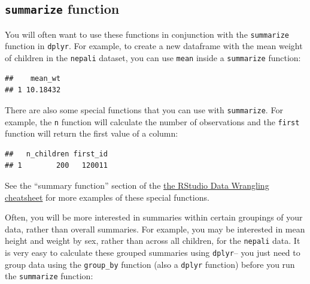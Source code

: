 \documentclass[]{book}
\makeatletter
\newenvironment{Shaded}{\begin{snugshade}}{\end{snugshade}}
\newcommand{\KeywordTok}[1]{\textcolor[rgb]{0.13,0.29,0.53}{\textbf{#1}}}
\newcommand{\DataTypeTok}[1]{\textcolor[rgb]{0.13,0.29,0.53}{#1}}
\newcommand{\StringTok}[1]{\textcolor[rgb]{0.31,0.60,0.02}{#1}}
\newcommand{\OtherTok}[1]{\textcolor[rgb]{0.56,0.35,0.01}{#1}}
\newcommand{\OperatorTok}[1]{\textcolor[rgb]{0.81,0.36,0.00}{\textbf{#1}}}
\newcommand{\NormalTok}[1]{#1}
\newenvironment{kframe}{%
\medskip{}
\setlength{\fboxsep}{.8em}
 \def\at@end@of@kframe{}%
 \ifinner\ifhmode%
  \def\at@end@of@kframe{\end{minipage}}%
  \begin{minipage}{\columnwidth}%
 \fi\fi%
 \def\FrameCommand##1{\hskip\@totalleftmargin \hskip-\fboxsep
 \colorbox{shadecolor}{##1}\hskip-\fboxsep
     \hskip-\linewidth \hskip-\@totalleftmargin \hskip\columnwidth}%
 \MakeFramed {\advance\hsize-\width
   \@totalleftmargin\z@ \linewidth\hsize
   \@setminipage}}%
 {\par\unskip\endMakeFramed%
 \at@end@of@kframe}
\renewenvironment{Shaded}{\begin{kframe}}{\end{kframe}}
\theoremstyle{definition}
\theoremstyle{definition}
\theoremstyle{definition}
\theoremstyle{remark}
\makeatother
\begin{document}
\subsection{\texorpdfstring{\texttt{summarize}
function}{summarize function}}\label{summarize-function}

You will often want to use these functions in conjunction with the
\texttt{summarize} function in \texttt{dplyr}. For example, to create a
new dataframe with the mean weight of children in the \texttt{nepali}
dataset, you can use \texttt{mean} inside a \texttt{summarize} function:

\begin{Shaded}
\end{Shaded}

\begin{verbatim}
##    mean_wt
## 1 10.18432
\end{verbatim}

There are also some special functions that you can use with
\texttt{summarize}. For example, the \texttt{n} function will calculate
the number of observations and the \texttt{first} function will return
the first value of a column:

\begin{Shaded}
\end{Shaded}

\begin{verbatim}
##   n_children first_id
## 1        200   120011
\end{verbatim}

See the ``summary function'' section of the
\href{https://www.rstudio.com/wp-content/uploads/2015/02/data-wrangling-cheatsheet.pdf}{the
RStudio Data Wrangling cheatsheet} for more examples of these special
functions.

Often, you will be more interested in summaries within certain groupings
of your data, rather than overall summaries. For example, you may be
interested in mean height and weight by sex, rather than across all
children, for the \texttt{nepali} data. It is very easy to calculate
these grouped summaries using \texttt{dplyr}-- you just need to group
data using the \texttt{group\_by} function (also a \texttt{dplyr}
function) before you run the \texttt{summarize} function:
\end{document}
